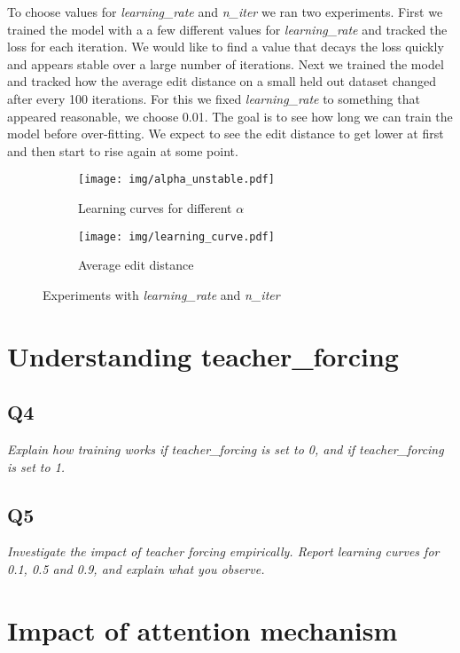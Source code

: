\documentclass[12pt]{article}
\begin{document}
To choose values for \textit{learning\_rate} and \textit{n\_iter} we ran two experiments. 
First we trained the model with a a few different values for \textit{learning\_rate} and tracked the loss for each iteration. We would like to find a value that decays the loss quickly and appears stable over a large number of iterations.
Next we trained the model and tracked how the average edit distance on a small held out dataset changed after every 100 iterations. For this we fixed \textit{learning\_rate} to something that appeared reasonable, we choose 0.01. The goal is to see how long we can train the model before over-fitting. We expect to see the edit distance to get lower at first and then start to rise again at some point.

\begin{figure}[t!]
    \begin{subfigure}[t]{0.5\textwidth}
        \centering
        \texttt{[image: img/alpha\_unstable.pdf]}
        \caption{Learning curves for different $\alpha$}
        \label{fig_learning_rate}
    \end{subfigure}
    \begin{subfigure}[t]{0.5\textwidth}
        \centering
        \texttt{[image: img/learning\_curve.pdf]}
        \caption{Average edit distance}
        \label{fig_n_iter}
    \end{subfigure}
	\caption{Experiments with \textit{learning\_rate} and \textit{n\_iter}}
	\label{fig_train_param}
\end{figure}


\section{Understanding teacher\_forcing}

\subsection{Q4}
\textit{
Explain how training works if teacher\_forcing is set to 0, and if teacher\_forcing is set to 1.
}

\subsection{Q5}
\textit{
Investigate the impact of teacher forcing empirically. Report learning curves for 0.1, 0.5 and 0.9, and explain what you observe.
}


\section{Impact of attention mechanism}
\end{document}
